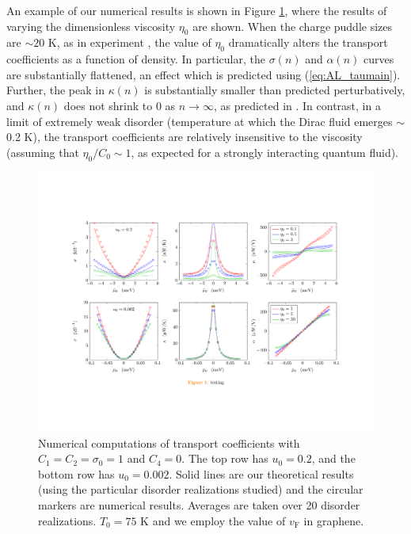 An example of our numerical results is shown in Figure \ref{fig:AL_viscfig}, where the results of varying the dimensionless viscosity $\eta_0$ are shown.    When the charge puddle sizes are $\sim 20$ K, as in experiment \cite{xue_scanning_2011}, the  value of $\eta_0$ dramatically alters the transport coefficients as a function of density.   In particular, the $\sigma(n)$ and $\alpha(n)$ curves are substantially flattened, an effect which is predicted using (\ref{eq:AL_taumain}).   Further, the peak in $\kappa(n)$ is substantially smaller than predicted perturbatively, and $\kappa(n)$ does not shrink to 0 as $n\rightarrow\infty$, as predicted in \cite{hartnoll_theory_2007}.   In contrast, in a limit of extremely weak disorder (temperature at which the Dirac fluid  emerges $\sim$ 0.2 K),  the transport coefficients are relatively insensitive to the viscosity (assuming that $\eta_0/C_0 \sim 1$, as expected for a strongly interacting quantum fluid).  

\begin{figure}[t]
\centering
\includegraphics[width=7in]{figures/hydro_theory/viscosityplot.pdf}
\caption{Numerical computations of transport coefficients with $C_1=C_2=\sigma_0=1$ and $C_4=0$.   The top row has $u_0=0.2$, and the bottom row has $u_0=0.002$.   Solid lines are our theoretical results (using the particular disorder realizations studied) and the circular markers are numerical results.   Averages are taken over 20 disorder realizations.  $T_0=75$ K and we employ the value of $v_{\mathrm{F}}$ in graphene.  }
\label{fig:AL_viscfig}
\end{figure}

